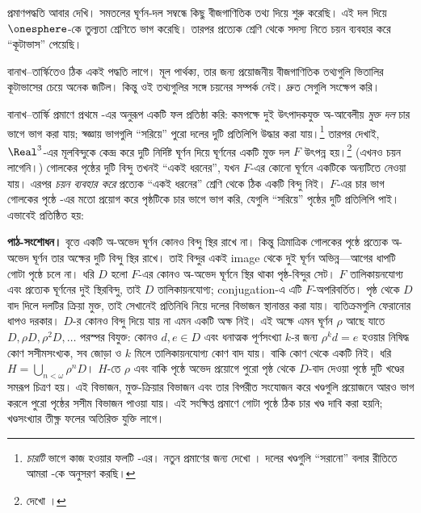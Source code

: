 \documentclass[../../../include/open-logic-section]{subfiles}
\begin{document}
প্রমাণপদ্ধতি আবার দেখি। সমতলের ঘূর্ণন-দল
সম্বন্ধে কিছু বীজগাণিতিক তথ্য দিয়ে শুরু করেছি।
এই দল দিয়ে $\onesphere$-কে তুল্যতা
শ্রেণিতে ভাগ করেছি। তারপর প্রত্যেক শ্রেণি
থেকে সদস্য নিতে চয়ন ব্যবহার করে
``কূটাভাস'' পেয়েছি।

বানাখ--তার্স্কিতেও ঠিক একই পদ্ধতি লাগে।
মূল পার্থক্য, তার জন্য প্রয়োজনীয়
বীজগাণিতিক তথ্যগুলি ভিতালির কূটাভাসের
চেয়ে অনেক জটিল। কিন্তু ওই তথ্যগুলির সঙ্গে
চয়নের সম্পর্ক নেই। দ্রুত সেগুলি সংক্ষেপ করি।

বানাখ--তার্স্কি প্রমাণে প্রথমে
-এর অনুরূপ একটি
ফল প্রতিষ্ঠা করি: কমপক্ষে দুই উৎপাদকযুক্ত
অ-আবেলীয় \emph{মুক্ত দল} চার ভাগে
ভাগ করা যায়; স্বজ্ঞায় ভাগগুলি ``সরিয়ে''
পুরো দলের দুটি প্রতিলিপি উদ্ধার করা যায়।\footnote{
\emph{চারটি} ভাগে কাজ হওয়ার ফলটি
\cite{Robinson1947}-এর। নতুন প্রমাণের জন্য
দেখো \citet[Theorem 5.2]{Wagon2016}।
দলের খণ্ডগুলি ``সরানো'' বলার রীতিতে আমরা
\citet[p.~3]{Weston2003}-কে অনুসরণ করছি।}
তারপর দেখাই, $\Real^3$-এর মূলবিন্দুকে
কেন্দ্র করে দুটি নির্দিষ্ট ঘূর্ণন দিয়ে
ঘূর্ণনের একটি মুক্ত দল $F$ উৎপন্ন হয়।\footnote{
দেখো \citet[Theorem 2.1]{Wagon2016}।}
(এখনও চয়ন লাগেনি।) গোলকের পৃষ্ঠের দুটি
বিন্দু তখনই ``একই ধরনের'', যখন $F$-এর
কোনো ঘূর্ণনে একটিকে অন্যটিতে নেওয়া যায়।
এরপর \emph{চয়ন ব্যবহার করে} প্রত্যেক
``একই ধরনের'' শ্রেণি থেকে ঠিক একটি
বিন্দু নিই। $F$-এর চার ভাগ গোলকের
পৃষ্ঠে -এর
মতো প্রয়োগ করে পৃষ্ঠটিকে চার ভাগে
ভাগ করি, যেগুলি ``সরিয়ে'' পৃষ্ঠের
দুটি প্রতিলিপি পাই। এভাবেই
\citep{Hausdorff1914} প্রতিষ্ঠিত হয়:
\par\noindent\textbf{পাঠ-সংশোধন।} বৃত্তে একটি অ-অভেদ ঘূর্ণন কোনও বিন্দু স্থির রাখে না। কিন্তু
ত্রিমাত্রিক গোলকের পৃষ্ঠে প্রত্যেক অ-অভেদ ঘূর্ণন তার অক্ষের
দুটি বিন্দু স্থির রাখে। তাই বিন্দুর একই image থেকে দুই
ঘূর্ণন অভিন্ন—আগের ধাপটি গোটা পৃষ্ঠে চলে না। ধরি $D$ হলো
$F$-এর কোনও অ-অভেদ ঘূর্ণনে স্থির থাকা পৃষ্ঠ-বিন্দুর সেট।
$F$ তালিকায়নযোগ্য এবং প্রত্যেক ঘূর্ণনের দুই স্থিরবিন্দু,
তাই $D$ তালিকায়নযোগ্য; conjugation-এ এটি $F$-অপরিবর্তিত।
পৃষ্ঠ থেকে $D$ বাদ দিলে দলটির ক্রিয়া মুক্ত, তাই সেখানেই
প্রতিনিধি নিয়ে দলের বিভাজন স্থানান্তর করা যায়।
ব্যতিক্রমগুলি ফেরানোর ধাপও দরকার। $D$-র কোনও বিন্দু দিয়ে
যায় না এমন একটি অক্ষ নিই। এই অক্ষে এমন ঘূর্ণন $\rho$
আছে যাতে $D,\rho D,\rho^2D,\ldots$ পরস্পর বিযুক্ত:
কোনও $d,e\in D$ এবং ধনাত্মক পূর্ণসংখ্যা $k$-র জন্য
$\rho^k d=e$ হওয়ার নিষিদ্ধ কোণ সসীমসংখ্যক, সব জোড়া ও
$k$ মিলে তালিকায়নযোগ্য কোণ বাদ যায়। বাকি কোণ থেকে একটি
নিই। ধরি $H=\bigcup_{n<\omega}\rho^nD$। $H$-তে
$\rho$ এবং বাকি পৃষ্ঠে অভেদ প্রয়োগে পুরো পৃষ্ঠ থেকে
$D$-বাদ দেওয়া পৃষ্ঠে দুটি খণ্ডের সমরূপ চিত্রণ হয়।
এই বিভাজন, মুক্ত-ক্রিয়ার বিভাজন এবং তার বিপরীত সংযোজন করে
খণ্ডগুলি প্রয়োজনে আরও ভাগ করলে পুরো পৃষ্ঠের সসীম বিভাজন
পাওয়া যায়। এই সংক্ষিপ্ত প্রমাণে গোটা পৃষ্ঠে ঠিক চার খণ্ড
দাবি করা হয়নি; খণ্ডসংখ্যার তীক্ষ্ণ ফলের অতিরিক্ত যুক্তি লাগে।
\end{document}
